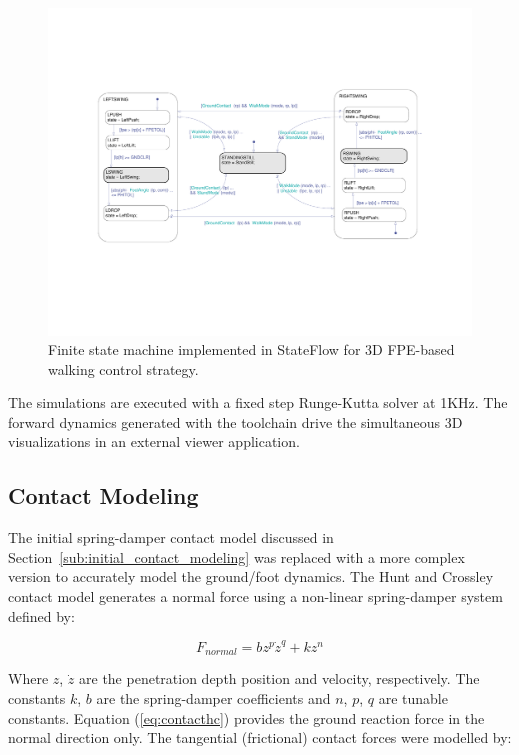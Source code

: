 \begin{figure}[!b]
	\centering
    \includegraphics[trim = 30mm 60mm 25mm 53mm,clip,width=17cm]{fig/simulations/statemachine.pdf} 
  	\caption{Finite state machine implemented in StateFlow for 3D FPE-based walking control strategy.}
	\label{fig:stateflow}
\end{figure}

The simulations are executed with a fixed step Runge-Kutta solver at 1KHz. The forward dynamics generated with the toolchain drive the simultaneous 3D visualizations in an external viewer application.  

\subsection{Contact Modeling} %
\label{sub:full_contact_modeling}
The initial spring-damper contact model discussed in Section~\ref{sub:initial_contact_modeling} was replaced with a more complex version to accurately model the ground/foot dynamics. The Hunt and Crossley contact model \cite{hunt1975coefficient,gilardi2002literature} generates a normal force using a non-linear spring-damper system defined by: 

\begin{equation}
	\label{eq:contacthc}
	{F_{normal}} = b{z^p}{\dot z^q} + k{z^n}
\end{equation}

Where $z$, $\dot{z}$ are the penetration depth position and velocity, respectively. The constants $k$, $b$ are the spring-damper coefficients and $n$, $p$, $q$ are tunable constants. Equation (\ref{eq:contacthc}) provides the ground reaction force in the normal direction only. The tangential (frictional) contact forces were modelled by: 


